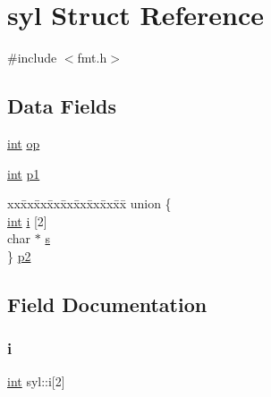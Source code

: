 \hypertarget{structsyl}{}\section{syl Struct Reference}
\label{structsyl}


{\ttfamily \#include $<$fmt.\+h$>$}

\subsection*{Data Fields}
\begin{DoxyCompactItemize}
\item 
\hyperlink{lp__lib_8h_adeb9ec6400320e4923ac9d836d509ddb}{int} \hyperlink{structsyl_a6de31f08b3e580e1b8dfd5fc17815aa7}{op}
\item 
\hyperlink{lp__lib_8h_adeb9ec6400320e4923ac9d836d509ddb}{int} \hyperlink{structsyl_a302ebd4e0dda93a20c68dada78f2dc8c}{p1}
\item 
\begin{tabbing}
xx\=xx\=xx\=xx\=xx\=xx\=xx\=xx\=xx\=\kill
union \{\\
\>\hyperlink{lp__lib_8h_adeb9ec6400320e4923ac9d836d509ddb}{int} \hyperlink{structsyl_a8d8ae460f0da7e23b838af77bbc9a007}{i} \mbox{[}2\mbox{]}\\
\>char $\ast$ \hyperlink{structsyl_afeda6c6954cd797655700a009e581d8c}{s}\\
\} \hyperlink{structsyl_a0f3aca6d41f5cce9998bced8303f82d3}{p2}\\

\end{tabbing}\end{DoxyCompactItemize}


\subsection{Field Documentation}
\mbox{\label{structsyl_a8d8ae460f0da7e23b838af77bbc9a007}} 
\subsubsection{\texorpdfstring{i}{i}}
{\footnotesize\ttfamily \hyperlink{lp__lib_8h_adeb9ec6400320e4923ac9d836d509ddb}{int} syl\+::i\mbox{[}2\mbox{]}}

\mbox{\label{structsyl_a6de31f08b3e580e1b8dfd5fc17815aa7}} 
